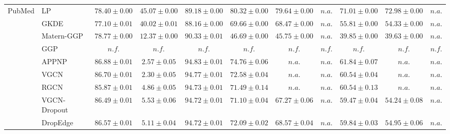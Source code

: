 \begin{table*}[!h]
{\begin{tabular}{ll|cc|cccc|ccc}
        \midrule
        
        \multirow{14}{*}{PubMed} 
        & LP & ${78.40\scriptscriptstyle \pm 0.00}$ & ${45.07\scriptscriptstyle \pm 0.00}$ & ${89.18\scriptscriptstyle \pm 0.00}$ & ${\mathbf{80.32}\scriptscriptstyle \pm 0.00}$ & ${{79.64}\scriptscriptstyle \pm 0.00}$ & $n.a.$ & ${{71.01}\scriptscriptstyle \pm 0.00}$ & ${\mathbf{72.98}\scriptscriptstyle \pm 0.00}$ & $n.a.$\\
        & GKDE & ${77.10\scriptscriptstyle \pm 0.01}$ & ${40.02\scriptscriptstyle \pm 0.01}$ & ${88.16\scriptscriptstyle \pm 0.00}$ & ${69.66\scriptscriptstyle \pm 0.00}$ & ${68.47\scriptscriptstyle \pm 0.00}$ & $n.a.$ & ${55.81\scriptscriptstyle \pm 0.00}$ & ${54.33\scriptscriptstyle \pm 0.00}$ & $n.a.$\\
        & Matern-GGP & ${78.77\scriptscriptstyle \pm 0.00}$ & ${12.37\scriptscriptstyle \pm 0.00}$ & ${90.33\scriptscriptstyle \pm 0.01}$ & ${46.69\scriptscriptstyle \pm 0.00}$ & ${45.75\scriptscriptstyle \pm 0.00}$ & $n.a.$ & ${39.85\scriptscriptstyle \pm 0.00}$ & ${39.63\scriptscriptstyle \pm 0.00}$ & $n.a.$\\
        & GGP & $n.f.$ & $n.f.$ & $n.f.$ & $n.f.$ & $n.f.$ & $n.f.$ & $n.f.$ & $n.f.$ & $n.f.$\\
        & APPNP & ${\mathbf{86.88}\scriptscriptstyle \pm 0.01}$ & ${2.57\scriptscriptstyle \pm 0.05}$ & ${94.83\scriptscriptstyle \pm 0.01}$ & ${74.76\scriptscriptstyle \pm 0.06}$ & $n.a.$ & $n.a.$ & ${61.84\scriptscriptstyle \pm 0.07}$ & $n.a.$ & $n.a.$\\
        & VGCN & ${86.70\scriptscriptstyle \pm 0.01}$ & ${2.30\scriptscriptstyle \pm 0.05}$ & ${94.77\scriptscriptstyle \pm 0.01}$ & ${72.58\scriptscriptstyle \pm 0.04}$ & $n.a.$ & $n.a.$ & ${60.54\scriptscriptstyle \pm 0.04}$ & $n.a.$ & $n.a.$\\
        & RGCN & ${85.87\scriptscriptstyle \pm 0.01}$ & ${4.86\scriptscriptstyle \pm 0.05}$ & ${94.73\scriptscriptstyle \pm 0.01}$ & ${71.49\scriptscriptstyle \pm 0.14}$ & $n.a.$ & $n.a.$ & ${60.54\scriptscriptstyle \pm 0.13}$ & $n.a.$ & $n.a.$\\
        & VGCN-Dropout & ${86.49\scriptscriptstyle \pm 0.01}$ & ${5.53\scriptscriptstyle \pm 0.06}$ & ${94.72\scriptscriptstyle \pm 0.01}$ & ${71.10\scriptscriptstyle \pm 0.04}$ & ${67.27\scriptscriptstyle \pm 0.06}$ & $n.a.$ & ${59.47\scriptscriptstyle \pm 0.04}$ & ${54.24\scriptscriptstyle \pm 0.08}$ & $n.a.$\\
        & DropEdge & ${86.57\scriptscriptstyle \pm 0.01}$ & ${5.11\scriptscriptstyle \pm 0.04}$ & ${94.72\scriptscriptstyle \pm 0.01}$ & ${72.09\scriptscriptstyle \pm 0.02}$ & ${68.57\scriptscriptstyle \pm 0.04}$ & $n.a.$ & ${59.84\scriptscriptstyle \pm 0.03}$ & ${54.95\scriptscriptstyle \pm 0.06}$ & $n.a.$\\

\end{tabular}}
\end{table*}
